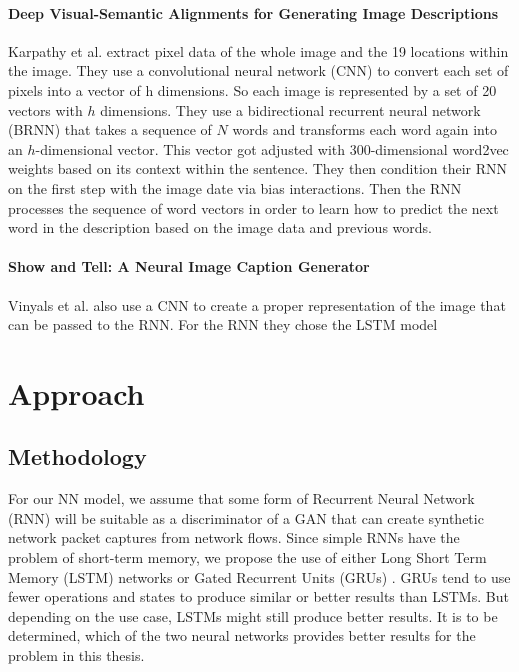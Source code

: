 \documentclass[
	ngerman,
	ruledheaders=section,%
	class=report,%
	thesis={type=bachelor},%
	accentcolor=9c,%
	custommargins=true,%
	marginpar=false,%
	parskip=half-,%
	fontsize=11pt,%
]{tudapub}
\begin{document}
\subsubsection{Deep Visual-Semantic Alignments for Generating Image Descriptions} %
\label{sec:karpathy}

Karpathy et al. extract pixel data of the whole image and the 19 locations within the image.
They use a convolutional neural network (CNN) to convert each set of pixels into a vector of h dimensions.
So each image is represented by a set of 20 vectors with $h$ dimensions.
They use a bidirectional recurrent neural network (BRNN) that takes a sequence of $N$ words and transforms each word again into an $h$-dimensional vector.
This vector got adjusted with 300-dimensional word2vec weights based on its context within the sentence.
They then condition their RNN on the first step with the image date via bias interactions.
Then the RNN processes the sequence of word vectors in order to learn how to predict the next word in the description based on the image data and previous words.

\subsubsection{Show and Tell: A Neural Image Caption Generator} %
\label{sec:vinyals}

Vinyals et al. also use a CNN to create a proper representation of the image that can be passed to the RNN.
For the RNN they chose the LSTM model


\chapter{Approach}
\label{sec:approach}

\section{Methodology}
\label{sec:methodology}

For our NN model, we assume that some form of Recurrent Neural Network (RNN) will be suitable as a discriminator of a GAN that can create synthetic network packet captures from network flows.
Since simple RNNs have the problem of short-term memory, we propose the use of either Long Short Term Memory (LSTM) networks \cite{hochreiterLongShortTermMemory1997} or Gated Recurrent Units (GRUs) \cite{bahdanauNeuralMachineTranslation2016}.
GRUs tend to use fewer operations and states to produce similar or better results than LSTMs.
But depending on the use case, LSTMs might still produce better results.
It is to be determined, which of the two neural networks provides better results for the problem in this thesis.
\end{document}
